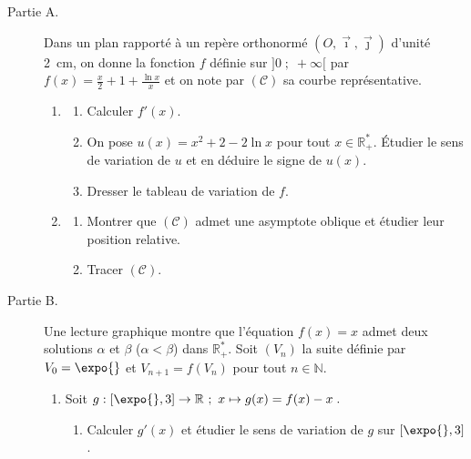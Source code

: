 \begin{exo}
\label{exo:el suite vers beta}
      \begin{description}
            \item[Partie A.]
                  Dans un plan rapport\'e \`a un rep\`ere orthonorm\'e $(O,\vec{\imath},\vec{\jmath})$ d'unit\'e 2~cm,
                  on donne la fonction $f$ d\'efinie sur $]0 \; ; \; +\infty[$ par $f(x) = \frac{x}{2} + 1 + \frac{\ln x}{x}$ et
                  on note par $(\mathcal{C})$ sa courbe repr\'esentative.
                  \begin{enumerate}
                        \item \begin{enumerate}
                                    \item Calculer $f'(x)$.
                                    \item On pose $u(x) = x^2 + 2 - 2 \ln x$ pour tout $x \in \mathbb{R}^*_+$.
                                          \'Etudier le sens de variation de $u$ et en d\'eduire le signe de $u(x)$.
                                    \item Dresser le tableau de variation de $f$.
                              \end{enumerate}
                        \item \begin{enumerate}
                                    \item Montrer que $(\mathcal{C})$ admet une asymptote oblique et \'etudier leur position relative.
                                    \item Tracer $(\mathcal{C})$.
                              \end{enumerate}
                  \end{enumerate}
            \item[Partie B.]
                  Une lecture graphique montre que l'\'equation $f(x) = x$ admet
                  deux solutions $\alpha $ et $\beta$ ($\alpha < \beta$) dans $\mathbb{R}^*_+$.
                  Soit $(V_n)$ la suite d\'efinie par $V_0 = \expo{}$ et $V_{n + 1} = f(V_n)$ pour tout $n \in \mathbb{N}$.
                  \begin{enumerate}
                        \item Soit $g : [\expo{} , 3] \rightarrow \mathbb{R} \ ;\ x \mapsto g(x) = f(x) - x \; . $
                              \begin{enumerate}
                                    \item Calculer $g'(x) $ et \'etudier le sens de variation de $g$ sur $[\expo{},3]$.

\end{enumerate}
\end{enumerate}
\end{description}
\end{exo}
